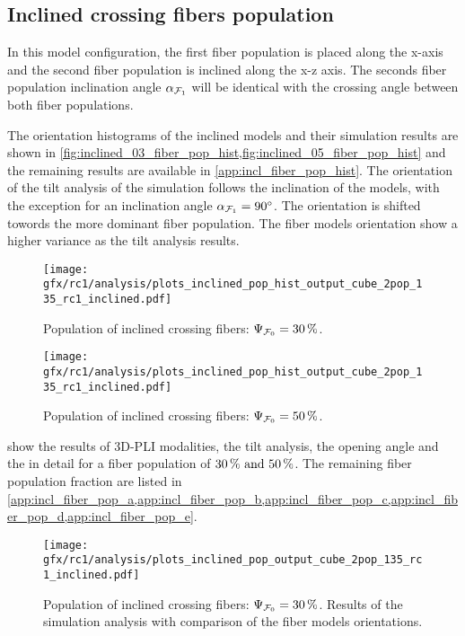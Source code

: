 \subsection{Inclined crossing fibers population}
\label{sec:resInclCross}
% 
In this model configuration, the first fiber population \popa{} is placed along the x-axis and the second fiber population is inclined along the x-z axis.
The seconds fiber population inclination angle $\textnormal{$\alpha$}_{\textnormal{$\mathcal{F}_1$}}$ will be identical with the crossing angle \modelOmega{} between both fiber populations.
\par
%
The orientation histograms of the inclined models and their simulation results are shown in \cref{fig:inclined_03_fiber_pop_hist,fig:inclined_05_fiber_pop_hist} and the remaining results are available in \cref{app:incl_fiber_pop_hist}.
The orientation of the tilt analysis of the simulation follows the inclination of the models, with the exception for an inclination angle $\textnormal{$\alpha$}_{\textnormal{$\mathcal{F}_1$}} = \SI{90}{\degree}$.
The orientation is shifted towords the more dominant fiber population.
The fiber models orientation show a higher variance as the tilt analysis results.
\par
%
\begin{figure}[!p]
\centering
\texttt{[image: gfx/rc1/analysis/plots\_inclined\_pop\_hist\_output\_cube\_2pop\_135\_rc1\_inclined.pdf]}
\caption{Population of inclined crossing fibers: $\textnormal{$\Psi_{\textnormal{$\mathcal{F}_0$}}$}=\SI{30}{\percent}$.
}
\label{fig:inclined_03_fiber_pop_hist}
% 
\vspace{2em}
\texttt{[image: gfx/rc1/analysis/plots\_inclined\_pop\_hist\_output\_cube\_2pop\_135\_rc1\_inclined.pdf]}
\caption{Population of inclined crossing fibers: $\textnormal{$\Psi_{\textnormal{$\mathcal{F}_0$}}$}=\SI{50}{\percent}$.
}
\label{fig:inclined_05_fiber_pop_hist}
\end{figure}
%
 show the results of \ac{3D-PLI} modalities, the tilt analysis, the opening angle and the \accvalue{} in detail for a fiber population of $\SIlist{30;50}{\percent}$.%
The remaining fiber population fraction are listed in \cref{app:incl_fiber_pop_a,app:incl_fiber_pop_b,app:incl_fiber_pop_c,app:incl_fiber_pop_d,app:incl_fiber_pop_e}.
\par
%
\begin{figure}[!p]
    \centering
    \texttt{[image: gfx/rc1/analysis/plots\_inclined\_pop\_output\_cube\_2pop\_135\_rc1\_inclined.pdf]}
    \caption{Population of inclined crossing fibers: $\textnormal{$\Psi_{\textnormal{$\mathcal{F}_0$}}$}=\SI{30}{\percent}$. Results of the simulation analysis with comparison of the fiber models orientations.}
    \label{fig:inclined_03_fiber_pop_rofl}
    \end{figure}

